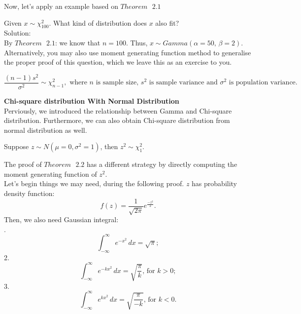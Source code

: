 \noindent
Now, let's apply an example based on $Theorem \text{ } 2.1$

\begin{example}
Given $x \sim \chi_{100}^{2}$. What kind of distribution does $x$ also fit?\\
Solution:\\
By $Theorem \text{ } 2.1$: we know that $n = 100$. Thus, $x \sim Gamma(\alpha = 50 \text{, } \beta = 2)$.\\
Alternatively, you may also use moment generating function method to generalise the proper proof of this question, which we leave this as an exercise to you.
\end{example}

\begin{theorem}
\[ \frac{(n-1)s^2}{\sigma^2} \sim \chi_{n-1}^{2}, \text{ where $n$ is sample size, $s^2$ is sample variance and $\sigma^2$ is population variance.}\]
\end{theorem}

\noindent
\textbf{Chi-square distribution With Normal Distribution}\\

\noindent
Perviously, we introduced the relationship between Gamma and Chi-square distribution. Furthermore, we can also obtain Chi-square distribution from normal distribution as well.

\begin{theorem}
Suppose $z \sim N(\mu = 0, \sigma^{2} = 1)$, then $z^{2} \sim \chi_{1}^{2}$.
\end{theorem}

\noindent
The proof of $Theorem \text{ }2.2$ has a different strategy by directly computing the moment generating function of $z^{2}$.\\

\noindent
Let's begin things we may need, during the following proof. $z$ has probability density function: \[ f(z) = \frac{1}{\sqrt{2\pi}}e^{ \frac{-z^{2}}{2}}.\]
Then, we also need Gaussian integral: \\

. \[ \int_{-\infty}^{\infty}e^{-x^{2}}\, dx = \sqrt{\pi};\]
2.\[ \int_{-\infty}^{\infty}e^{-kx^{2}} \, dx= \sqrt{ \frac{\pi}{k}} \text{, for $k > 0$};\]
3.\[ \int_{-\infty}^{\infty} e^{kx^{2}} \, dx = \sqrt{ \frac{\pi}{-k}} \text{, for $k < 0$.}\]

